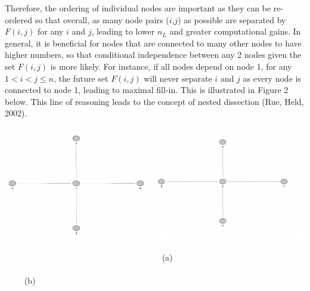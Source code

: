 \documentclass[]{article}
\begin{document}
Therefore, the ordering of individual nodes are important as they can be
re-ordered so that overall, as many node pairs (\(i\),\(j\)) as possible
are separated by \(F(i,j)\) for any \(i\) and \(j\), leading to lower
\(n_L\) and greater computational gains. In general, it is beneficial
for nodes that are connected to many other nodes to have higher numbers,
so that conditional independence between any 2 nodes given the set
\(F(i,j)\) is more likely. For instance, if all nodes depend on node 1,
for any \(1 < i < j \leq n\), the future set \(F(i,j)\) will never
separate \(i\) and \(j\) as every node is connected to node 1, leading
to maximal fill-in. This is illustrated in Figure 2 below. This line of
reasoning leads to the concept of nested dissection (Rue, Held, 2002).

\begin{center}\includegraphics[width=400bp]{Paper_files/figure-latex/future-1} \end{center}

~~~~~~~~~~~~~~~~~~~~~~~~~~~~~~~~~~~~~ (a)
~~~~~~~~~~~~~~~~~~~~~~~~~~~~~~~~~~~~~~~~~~~~~~~~~~~~~~~~~~~~~~~~~~~~~~~~~~~~
(b)

\begin{center}   \end{center}

\vspace{0.6cm}
\end{document}
